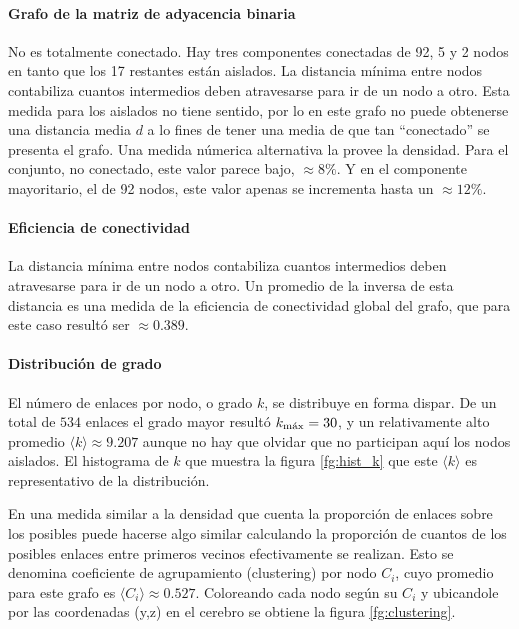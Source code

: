\documentclass{article}
\begin{document}
\paragraph{Grafo de la matriz de adyacencia binaria}
No es totalmente conectado. Hay tres componentes conectadas de 92, 5 y 2 nodos en tanto que los 17 restantes están aislados.
La distancia mínima entre nodos contabiliza cuantos intermedios deben atravesarse para ir de un nodo a otro.
Esta medida para los aislados no tiene sentido, por lo en este grafo no puede obtenerse una distancia media $d$ a lo fines de tener una media de que tan ``conectado'' se presenta el grafo.
Una medida númerica alternativa la provee la densidad.
Para el conjunto, no conectado, este valor parece bajo, $\approx 8\%$.
Y en el componente mayoritario, el de 92 nodos, este valor apenas se incrementa hasta un $\approx 12\%$. 


\paragraph{Eficiencia de conectividad}
La distancia mínima entre nodos contabiliza cuantos intermedios deben atravesarse para ir de un nodo a otro.
Un promedio de la inversa de esta distancia es una medida de la eficiencia de conectividad global del grafo, que para este caso resultó ser $\approx 0.389$.


\paragraph{Distribución de grado}
El número de enlaces por nodo, o grado $k$, se distribuye en forma dispar.
De un total de $534$ enlaces el grado mayor resultó $k_\textnormal{máx} = 30$, y un relativamente alto promedio $\langle k \rangle \approx 9.207$ aunque no hay que olvidar que no participan aquí los nodos aislados.
El histograma de $k$ que muestra la figura \ref{fg:hist_k} que este $\langle k \rangle$ es representativo de la distribución.

En una medida similar a la densidad que cuenta la proporción de enlaces sobre los posibles puede hacerse algo similar calculando la proporción de cuantos de los posibles enlaces entre primeros vecinos efectivamente se realizan.
Esto se denomina coeficiente de agrupamiento (clustering) por nodo $C_i$, cuyo promedio para este grafo es $\langle C_i \rangle \approx 0.527$. 
Coloreando cada nodo según su $C_i$ y ubicandole por las coordenadas (y,z) en el cerebro se obtiene la figura \ref{fg:clustering}. 
\end{document}
